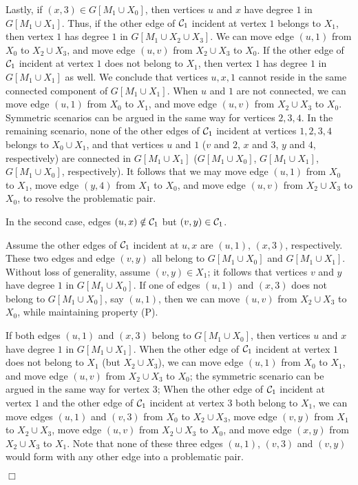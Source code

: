 \documentclass[11pt,twoside]{article}\usepackage{amssymb,latexsym,graphicx,hyperref}\usepackage{epstopdf}
\newenvironment{proof}{{\sc Proof. }}{\hfill$\Box$\vspace{0.2in}}
\begin{document}
\begin{proof}
Lastly, if $(x, 3) \in G[M_1 \cup X_0]$, then vertices $u$ and $x$ have degree $1$ in $G[M_1 \cup X_1]$.
Thus, if the other edge of ${\cal C}_1$ incident at vertex $1$ belongs to $X_1$, then vertex $1$ has degree $1$ in $G[M_1 \cup X_2 \cup X_3]$.
We can move edge $(u, 1)$ from $X_0$ to $X_2 \cup X_3$, and move edge $(u, v)$ from $X_2 \cup X_3$ to $X_0$.
If the other edge of ${\cal C}_1$ incident at vertex $1$ does not belong to $X_1$, then vertex $1$ has degree $1$ in $G[M_1 \cup X_1]$ as well.
We conclude that vertices $u, x, 1$ cannot reside in the same connected component of $G[M_1 \cup X_1]$.
When $u$ and $1$ are not connected, we can move edge $(u, 1)$ from $X_0$ to $X_1$, and move edge $(u, v)$ from $X_2 \cup X_3$ to $X_0$.
Symmetric scenarios can be argued in the same way for vertices $2, 3, 4$.
In the remaining scenario, none of the other edges of ${\cal C}_1$ incident at vertices $1, 2, 3, 4$ belongs to $X_0 \cup X_1$,
and that vertices $u$ and $1$ ($v$ and $2$, $x$ and $3$, $y$ and $4$, respectively) are connected in $G[M_1 \cup X_1]$
($G[M_1 \cup X_0]$, $G[M_1 \cup X_1]$, $G[M_1 \cup X_0]$, respectively).
It follows that we may move edge $(u, 1)$ from $X_0$ to $X_1$, move edge $(y, 4)$ from $X_1$ to $X_0$,
and move edge $(u, v)$ from $X_2 \cup X_3$ to $X_0$, to resolve the problematic pair.


In the second case, edges $(u, x) \notin {\cal C}_1$ but $(v, y) \in {\cal C}_1$.

Assume the other edges of ${\cal C}_1$ incident at $u, x$ are $(u, 1)$, $(x, 3)$, respectively.
These two edges and edge $(v, y)$ all belong to $G[M_1 \cup X_0]$ and $G[M_1 \cup X_1]$.
Without loss of generality, assume $(v, y) \in X_1$;
it follows that vertices $v$ and $y$ have degree $1$ in $G[M_1 \cup X_0]$.
If one of edges $(u, 1)$ and $(x, 3)$ does not belong to $G[M_1 \cup X_0]$, say $(u, 1)$, then we can move $(u, v)$ from $X_2 \cup X_3$ to $X_0$,
while maintaining property (P).


If both edges $(u, 1)$ and $(x, 3)$ belong to $G[M_1 \cup X_0]$, then vertices $u$ and $x$ have degree $1$ in $G[M_1 \cup X_1]$.
When the other edge of ${\cal C}_1$ incident at vertex $1$ does not belong to $X_1$ (but $X_2 \cup X_3$),
we can move edge $(u, 1)$ from $X_0$ to $X_1$, and move edge $(u, v)$ from $X_2 \cup X_3$ to $X_0$;
the symmetric scenario can be argued in the same way for vertex $3$;
When the other edge of ${\cal C}_1$ incident at vertex $1$ and the other edge of ${\cal C}_1$ incident at vertex $3$ both belong to $X_1$,
we can move edges $(u, 1)$ and $(v, 3)$ from $X_0$ to $X_2 \cup X_3$,
move edge $(v, y)$ from $X_1$ to $X_2 \cup X_3$,
move edge $(u, v)$ from $X_2 \cup X_3$ to $X_0$,
and move edge $(x, y)$ from $X_2 \cup X_3$ to $X_1$.
Note that none of these three edges $(u, 1)$, $(v, 3)$ and $(v, y)$ would form with any other edge into a problematic pair.



\end{proof}
\end{document}
